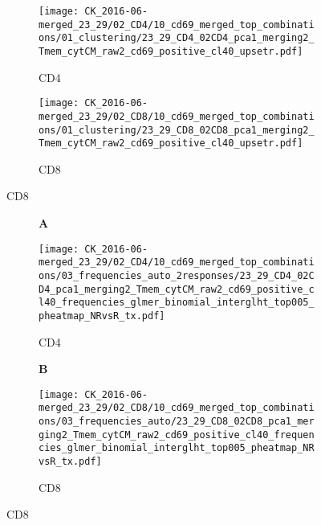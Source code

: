\documentclass[a4paper, 12pt]{article}
\begin{document}
\begin{figure}[!thb]
\centering

    \begin{subfigure}[t]{0.02\textwidth}
    \vskip 0pt
        \textbf{\textsf{\normalsize }}
    \end{subfigure}
    \begin{subfigure}[t]{0.97\textwidth}
    \vskip 0pt
    \caption{CD4}
        \texttt{[image: CK\_2016-06-merged\_23\_29/02\_CD4/10\_cd69\_merged\_top\_combinations/01\_clustering/23\_29\_CD4\_02CD4\_pca1\_merging2\_Tmem\_cytCM\_raw2\_cd69\_positive\_cl40\_upsetr.pdf]}
    \end{subfigure}

    \begin{subfigure}[t]{0.02\textwidth}
    \vskip 0pt
        \textbf{\textsf{\normalsize }}
    \end{subfigure}
    \begin{subfigure}[t]{0.97\textwidth}
    \vskip 0pt
    \caption{CD8}
        \texttt{[image: CK\_2016-06-merged\_23\_29/02\_CD8/10\_cd69\_merged\_top\_combinations/01\_clustering/23\_29\_CD8\_02CD8\_pca1\_merging2\_Tmem\_cytCM\_raw2\_cd69\_positive\_cl40\_upsetr.pdf]}
    \end{subfigure}
    
    
\end{figure}


\clearpage


\begin{figure}[!thb]
\centering
    
    \caption{Significant cytokine combinations for TX - FDR = 5\%}
    \begin{subfigure}[t]{0.02\textwidth}
    \vskip 0pt
        \textbf{\textsf{\normalsize A}}
    \end{subfigure}
    \begin{subfigure}[t]{0.45\textwidth}
    \vskip 0pt
    \caption{CD4}
        \texttt{[image: CK\_2016-06-merged\_23\_29/02\_CD4/10\_cd69\_merged\_top\_combinations/03\_frequencies\_auto\_2responses/23\_29\_CD4\_02CD4\_pca1\_merging2\_Tmem\_cytCM\_raw2\_cd69\_positive\_cl40\_frequencies\_glmer\_binomial\_interglht\_top005\_pheatmap\_NRvsR\_tx.pdf]}
    \end{subfigure}
\quad
    \begin{subfigure}[t]{0.02\textwidth}
    \vskip 0pt
        \textbf{\textsf{\normalsize B}}
    \end{subfigure}
    \begin{subfigure}[t]{0.45\textwidth}
    \vskip 0pt
    \caption{CD8}
        \texttt{[image: CK\_2016-06-merged\_23\_29/02\_CD8/10\_cd69\_merged\_top\_combinations/03\_frequencies\_auto/23\_29\_CD8\_02CD8\_pca1\_merging2\_Tmem\_cytCM\_raw2\_cd69\_positive\_cl40\_frequencies\_glmer\_binomial\_interglht\_top005\_pheatmap\_NRvsR\_tx.pdf]}
    \end{subfigure}
    
    
\end{figure}
\end{document}
